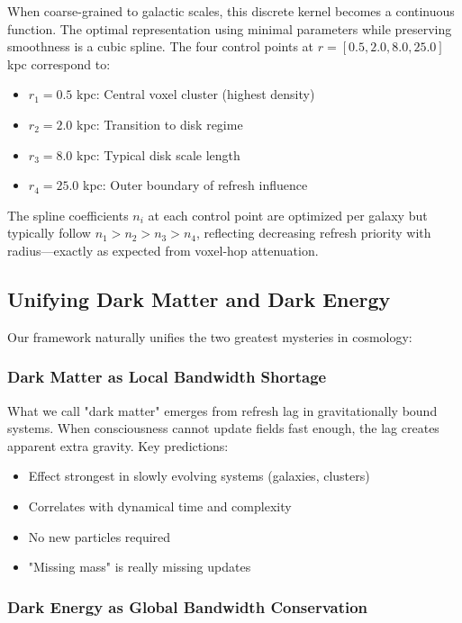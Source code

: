 \documentclass[twocolumn,prd,amsmath,amssymb,aps,superscriptaddress,nofootinbib]{revtex4-2}
\begin{document}
When coarse-grained to galactic scales, this discrete kernel becomes a continuous function. The optimal representation using minimal parameters while preserving smoothness is a cubic spline. The four control points at $r = [0.5, 2.0, 8.0, 25.0]$ kpc correspond to:
\begin{itemize}
\item $r_1 = 0.5$ kpc: Central voxel cluster (highest density)
\item $r_2 = 2.0$ kpc: Transition to disk regime
\item $r_3 = 8.0$ kpc: Typical disk scale length
\item $r_4 = 25.0$ kpc: Outer boundary of refresh influence
\end{itemize}

The spline coefficients $n_i$ at each control point are optimized per galaxy but typically follow $n_1 > n_2 > n_3 > n_4$, reflecting decreasing refresh priority with radius---exactly as expected from voxel-hop attenuation.

\subsection{Unifying Dark Matter and Dark Energy}

Our framework naturally unifies the two greatest mysteries in cosmology:

\subsubsection{Dark Matter as Local Bandwidth Shortage}

What we call "dark matter" emerges from refresh lag in gravitationally bound systems. When consciousness cannot update fields fast enough, the lag creates apparent extra gravity. Key predictions:
\begin{itemize}
\item Effect strongest in slowly evolving systems (galaxies, clusters)
\item Correlates with dynamical time and complexity
\item No new particles required
\item "Missing mass" is really missing updates
\end{itemize}

\subsubsection{Dark Energy as Global Bandwidth Conservation}
\end{document}
